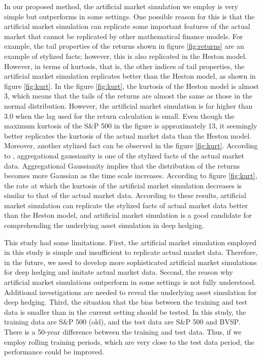 In our proposed method, the artificial market simulation we employ is very simple but outperforms in some settings.
One possible reason for this is that the artificial market simulation can replicate some important features of the actual market that cannot be replicated by other mathematical finance models.
For example, the tail properties of the returns shown in figure \ref{fig:returns} are an example of stylized facts; however, this is also replicated in the Heston model.
However, in terms of kurtosis, that is, the other indices of tail properties, the artificial market simulation replicates better than the Heston model, as shown in figure \ref{fig:kurt}.
In the figure \ref{fig:kurt}, the kurtosis of the Heston model is almost 3, which means that the tails of the returns are almost the same as those in the normal distribution.
However, the artificial market simulation is far higher than 3.0 when the lag used for the return calculation is small.
Even though the maximum kurtosis of the S\&P 500 in the figure is approximately 13, it seemingly better replicates the kurtosis of the actual market data than the Heston model.
Moreover, another stylized fact can be observed in the figure \ref{fig:kurt}.
According to \cite{Cont2001}, aggregational gaussianity is one of the stylized facts of the actual market data.
Aggregational Gaussianity implies that the distribution of the returns becomes more Gaussian as the time scale increases.
According to figure \ref{fig:kurt}, the rate at which the kurtosis of the artificial market simulation decreases is similar to that of the actual market data.
According to these results, artificial market simulation can replicate the stylized facts of actual market data better than the Heston model, and artificial market simulation is a good candidate for comprehending the underlying asset simulation in deep hedging.

This study had some limitations.
First, the artificial market simulation employed in this study is simple and insufficient to replicate actual market data.
Therefore, in the future, we need to develop more sophisticated artificial market simulations for deep hedging and imitate actual market data.
Second, the reason why artificial market simulations outperform in some settings is not fully understood.
Additional investigations are needed to reveal the underlying asset simulation for deep hedging.
Third, the situation that the bias between the training and test data is smaller than in the current setting should be tested.
In this study, the training data are S\&P 500 (old), and the test data are S\&P 500 and BVSP. There is a 50-year difference between the training and test data.
Thus, if we employ rolling training periods, which are very close to the test data period, the performance could be improved.

